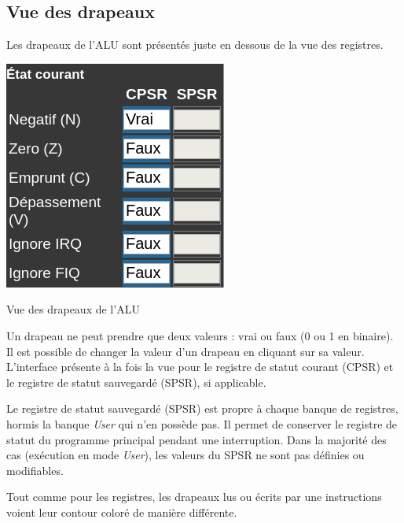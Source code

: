 \documentclass{tufte-handout}
\begin{document}
\clearpage

\subsection{Vue des drapeaux}

Les drapeaux de l'ALU sont présentés juste en dessous de la vue des registres.
\begin{marginfigure}
\includegraphics[width=0.9\linewidth]{pics/drapeaux.png}
\label{f:drapeaux}
\caption{Vue des drapeaux de l'ALU}
\end{marginfigure} 
Un drapeau ne peut prendre que deux valeurs : vrai ou faux (0 ou 1 en binaire). Il est possible de changer la valeur d'un drapeau en cliquant sur sa valeur. L'interface présente à la fois la vue pour le registre de statut courant (CPSR) et le registre de statut sauvegardé (SPSR), si applicable.

Le registre de statut sauvegardé (SPSR) est propre à chaque banque de registres, hormis la banque \textit{User} qui n'en possède pas. Il permet de conserver le registre de statut du programme principal pendant une interruption. Dans la majorité des cas (exécution en mode \textit{User}), les valeurs du SPSR ne sont pas définies ou modifiables.

Tout comme pour les registres, les drapeaux lus ou écrits par une instructions voient leur contour coloré de manière différente.
\end{document}
